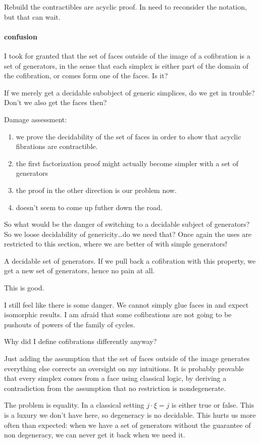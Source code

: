 \documentclass{tac}
\begin{document}
Rebuild the contractibles are acyclic proof. In need to reconsider the notation, but that can wait.

\paragraph{confusion}
I took for granted that the set of faces outside of the image of a cofibration is a set of generators, in the sense that each simplex is either part of the domain of the cofibration, or comes form one of the faces. Is it?

If we merely get a decidable subobject of generic simplices, do we get in trouble? Don't we also get the faces then?

Damage assessment:
\begin{enumerate}
\item we prove the decidability of the set of faces in order to show that acyclic fibrations are contractible.
\item the first factorization proof might actually become simpler
with a set of generators
\item the proof in the other direction is our problem now.
\item doesn't seem to come up futher down the road.
\end{enumerate}

So what would be the danger of switching to a decidable subject of generators?
So we loose decidability of genericity\dots do we need that?
Once again the uses are restricted to this section, where we are better of with simple generators!

A decidable set of generators. If we pull back a cofibration with this property, we get a new set of generators, hence no pain at all.

This is good.

I still feel like there is some danger. We cannot simply glue faces in and expect isomorphic results. I am afraid that some cofibrations are not going to be pushouts of powers of the family of cycles.

Why did I define cofibrations differently anyway?

Just adding the assumption that the set of faces outside of the image generates everything else corrects an oversight on my intuitions. It is probably provable that every simplex comes from a face using classical logic, by deriving a contradiction from the assumption that no restriction is nondegenerate.

The problem is equality. In a classical setting $j\cdot \xi = j$ is either true or false. This is a luxury we don't have here, so degeneracy is no decidable. This hurts us more often than expected: when we have a set of generators without the guarantee of non degeneracy, we can never get it back when we need it.
\end{document}
